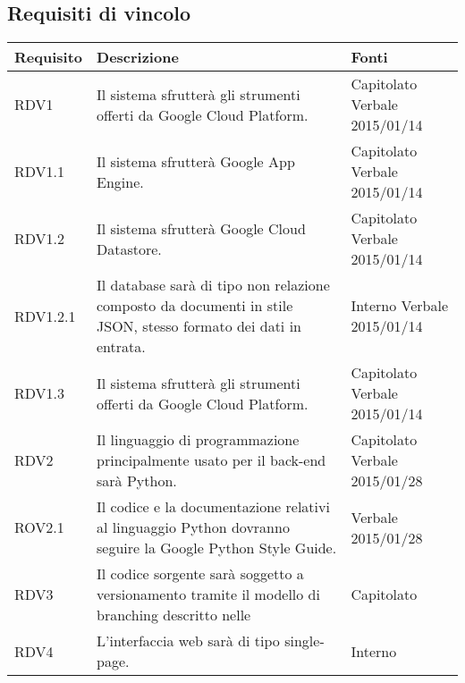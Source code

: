 \subsection{Requisiti di vincolo}

\begin{center}

	\def\arraystretch{1.5}
	\bgroup
	\begin{longtable}{| p{2.5cm} | p{8cm} | p{2cm} |}

		\hline
		\textbf{Requisito} & \textbf{Descrizione} & \textbf{Fonti} \\
		\hline

		RDV1  &  Il sistema sfrutterà gli strumenti offerti da Google Cloud Platform.  &  Capitolato \newline Verbale 2015/01/14 \\
		\hline
		RDV1.1  &  Il sistema sfrutterà Google App Engine.  &  Capitolato \newline Verbale 2015/01/14 \\
		\hline
		RDV1.2  &  Il sistema sfrutterà Google Cloud Datastore.  &  Capitolato \newline Verbale 2015/01/14 \\
		\hline
		RDV1.2.1  &  Il database sarà di tipo non relazione composto da documenti in stile JSON, stesso formato dei dati in entrata.  &  Interno \newline Verbale 2015/01/14 \\
		\hline
		RDV1.3  &  Il sistema sfrutterà gli strumenti offerti da Google Cloud Platform.  &  Capitolato \newline Verbale 2015/01/14 \\
		\hline

		RDV2  &  Il linguaggio di programmazione principalmente usato per il back-end sarà Python.  &  Capitolato \newline Verbale 2015/01/28 \\
		\hline
		ROV2.1 & Il codice e la documentazione relativi al linguaggio Python dovranno seguire la Google Python Style Guide. & Verbale 2015/01/28 \\
		\hline

		RDV3  &  Il codice sorgente sarà soggetto a versionamento tramite il modello di branching descritto nelle \docNameVersionNdP  &  Capitolato \\
		\hline
		RDV4  &  L'interfaccia web sarà di tipo single-page.  &  Interno \\
		\hline


\end{longtable}
\end{center}
